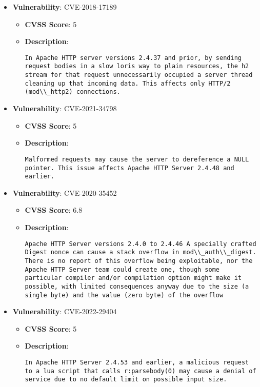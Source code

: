 \documentclass{article}
\begin{document}
\begin{itemize}
        \item \textbf{Vulnerability}: CVE-2018-17189
        \begin{itemize}
            \item \textbf{CVSS Score}:  5 
            \item \textbf{Description}:
            \parbox[t]{0.9\linewidth}{
                \verb|In Apache HTTP server versions 2.4.37 and prior, by sending request bodies in a slow loris way to plain resources, the h2 stream for that request unnecessarily occupied a server thread cleaning up that incoming data. This affects only HTTP/2 (mod\\_http2) connections.|
            }
        \end{itemize}
    
        \item \textbf{Vulnerability}: CVE-2021-34798
        \begin{itemize}
            \item \textbf{CVSS Score}:  5 
            \item \textbf{Description}:
            \parbox[t]{0.9\linewidth}{
                \verb|Malformed requests may cause the server to dereference a NULL pointer. This issue affects Apache HTTP Server 2.4.48 and earlier.|
            }
        \end{itemize}
    
        \item \textbf{Vulnerability}: CVE-2020-35452
        \begin{itemize}
            \item \textbf{CVSS Score}:  6.8 
            \item \textbf{Description}:
            \parbox[t]{0.9\linewidth}{
                \verb|Apache HTTP Server versions 2.4.0 to 2.4.46 A specially crafted Digest nonce can cause a stack overflow in mod\\_auth\\_digest. There is no report of this overflow being exploitable, nor the Apache HTTP Server team could create one, though some particular compiler and/or compilation option might make it possible, with limited consequences anyway due to the size (a single byte) and the value (zero byte) of the overflow|
            }
        \end{itemize}
    
        \item \textbf{Vulnerability}: CVE-2022-29404
        \begin{itemize}
            \item \textbf{CVSS Score}:  5 
            \item \textbf{Description}:
            \parbox[t]{0.9\linewidth}{
                \verb|In Apache HTTP Server 2.4.53 and earlier, a malicious request to a lua script that calls r:parsebody(0) may cause a denial of service due to no default limit on possible input size.|
            }
        \end{itemize}
    

\end{itemize}
\end{document}
